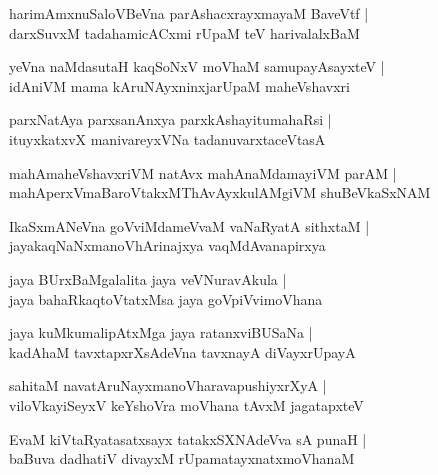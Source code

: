 \documentclass[twoside,12pt,openright]{book}
\newcounter{shloka}[chapter]
\begin{document}
\begin{shloka}%
harimAmxnuSaloVBeVna parAshacxrayxmayaM BaveVtf |\\
darxSuvxM tadahamicACxmi rUpaM teV harivalalxBaM 
\end{shloka}

\begin{shloka}%
yeVna naMdasutaH kaqSoNxV moVhaM samupayAsayxteV |\\
idAniVM mama kAruNAyxninxjarUpaM maheVshavxri
\end{shloka}

\begin{shloka}%
parxNatAya parxsanAnxya parxkAshayitumahaRsi |\\
ituyxkatxvX manivareyxVNa tadanuvarxtaceVtasA 
\end{shloka}

\begin{shloka}%
mahAmaheVshavxriVM natAvx mahAnaMdamayiVM parAM |\\
mahAperxVmaBaroVtakxMThAvAyxkulAMgiVM shuBeVkaSxNAM 
\end{shloka}

\begin{shloka}%
IkaSxmANeVna goVviMdameVvaM vaNaRyatA sithxtaM |\\
jayakaqNaNxmanoVhArinajxya vaqMdAvanapirxya
\end{shloka}

\begin{shloka}%
jaya BUrxBaMgalalita jaya veVNuravAkula |\\
jaya bahaRkaqtoVtatxMsa jaya goVpiVvimoVhana 
\end{shloka}

\begin{shloka}%
jaya kuMkumalipAtxMga jaya ratanxviBUSaNa |\\
kadAhaM tavxtapxrXsAdeVna tavxnayA diVayxrUpayA 
\end{shloka}

\begin{shloka}%
sahitaM navatAruNayxmanoVharavapushiyxrXyA |\\
viloVkayiSeyxV keYshoVra moVhana tAvxM jagatapxteV 
\end{shloka}

\begin{shloka}%
EvaM kiVtaRyatasatxsayx tatakxSXNAdeVva sA punaH |\\
baBuva dadhatiV divayxM rUpamatayxnatxmoVhanaM 
\end{shloka}
\end{document}
